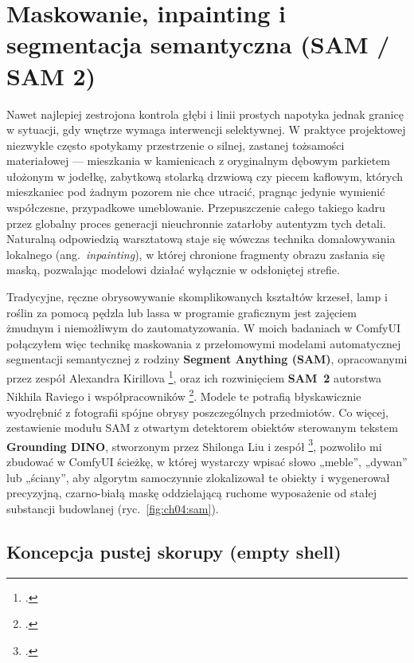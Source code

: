 \section{Maskowanie, inpainting i segmentacja semantyczna (SAM / SAM 2)}
\label{ch04:sec:sam}

Nawet najlepiej zestrojona kontrola głębi i linii prostych napotyka jednak granicę w sytuacji, gdy wnętrze wymaga interwencji selektywnej. W praktyce projektowej niezwykle często spotykamy przestrzenie o silnej, zastanej tożsamości materiałowej --- mieszkania w kamienicach z oryginalnym dębowym parkietem ułożonym w jodełkę, zabytkową stolarką drzwiową czy piecem kaflowym, których mieszkaniec pod żadnym pozorem nie chce utracić, pragnąc jedynie wymienić współczesne, przypadkowe umeblowanie. Przepuszczenie całego takiego kadru przez globalny proces generacji nieuchronnie zatarłoby autentyzm tych detali. Naturalną odpowiedzią warsztatową staje się wówczas technika domalowywania lokalnego (ang.\ \emph{inpainting}), w której chronione fragmenty obrazu zasłania się maską, pozwalając modelowi działać wyłącznie w odsłoniętej strefie.

Tradycyjne, ręczne obrysowywanie skomplikowanych kształtów krzeseł, lamp i roślin za pomocą pędzla lub lassa w programie graficznym jest zajęciem żmudnym i niemożliwym do zautomatyzowania. W moich badaniach w ComfyUI połączyłem więc technikę maskowania z przełomowymi modelami automatycznej segmentacji semantycznej z rodziny \textbf{Segment Anything (SAM)}, opracowanymi przez zespół Alexandra Kirillova \footcite{kirillov2023sam}, oraz ich rozwinięciem \textbf{SAM~2} autorstwa Nikhila Raviego i współpracowników \footcite{ravi2024sam2}. Modele te potrafią błyskawicznie wyodrębnić z fotografii spójne obrysy poszczególnych przedmiotów. Co więcej, zestawienie modułu SAM z otwartym detektorem obiektów sterowanym tekstem \textbf{Grounding DINO}, stworzonym przez Shilonga Liu i zespół \textcolor{orange}{\footcite{liu2024groundingdino}}, pozwoliło mi zbudować w ComfyUI ścieżkę, w której wystarczy wpisać słowo „meble”, „dywan” lub „ściany”, aby algorytm samoczynnie zlokalizował te obiekty i wygenerował precyzyjną, czarno-białą maskę oddzielającą ruchome wyposażenie od stałej substancji budowlanej (ryc.~\ref{fig:ch04:sam}).

\subsection{Koncepcja pustej skorupy (empty shell)}
\label{ch04:sec:empty-shell}

